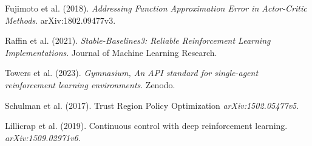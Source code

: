 \begin{large}
Fujimoto et al. (2018). \emph{Addressing Function Approximation Error in Actor-Critic Methods}. arXiv:1802.09477v3.

Raffin et al. (2021). \emph{Stable-Baselines3: Reliable Reinforcement Learning Implementations}. Journal of Machine Learning Research.

Towers et al. (2023). \emph{Gymnasium, An API standard for single-agent reinforcement learning environments}. Zenodo.

Schulman et al. (2017). Trust Region Policy Optimization \emph{arXiv:1502.05477v5}.

Lillicrap et al. (2019). Continuous control with deep reinforcement learning. \emph{arXiv:1509.02971v6}.

\end{large}

